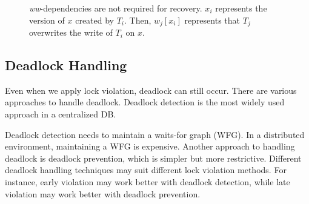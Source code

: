 \documentclass[conference]{IEEEtran}
\begin{document}
\begin{figure}[tbp]
  \caption{\emph{ww}-dependencies are not required for recovery.
  ${x_i}$ represents the version of $x$ created by ${T_i}$.
 Then, $w_j[x_i]$ represents that ${T_j}$ overwrites the write of ${T_i}$ on $x$.
}
\label{fig:versions_example}
\end{figure}


\subsection {Deadlock Handling}
\label{sec:deadlock_handling}
Even when we apply lock violation, deadlock can still occur.
There are various approaches to handle deadlock.
Deadlock detection is the most widely used approach in a centralized DB.

Deadlock detection needs to maintain a waits-for graph (WFG).
In a distributed environment, maintaining a WFG is expensive.
Another approach to handling deadlock is deadlock prevention, which is simpler but more restrictive.
Different deadlock handling techniques may suit different lock violation methods.
For instance, early violation may work better with deadlock detection, while late violation may work better with deadlock prevention.
\end{document}
